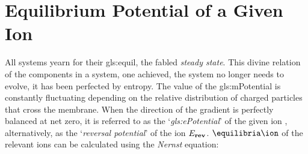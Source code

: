\documentclass[../../Orator]{subfiles}
\begin{document}
\section{Equilibrium Potential of a Given Ion}
\begingroup
\allowdisplaybreaks
All systems yearn for their \gls{gls:equil}, the fabled \textit{steady state}. This divine relation of the components in a system, one achieved, the system no longer needs to evolve, it has been perfected by entropy. 
The value of the \gls{gls:mPotential} is constantly fluctuating depending on the relative distribution of charged particles that cross the membrane. 
When the direction of the gradient is perfectly balanced at net zero, it is referred to as the `\textit{\gls{gls:ePotential}}' of the given ion \br{\unit{\equilibria\ion}}, alternatively, as the `\textit{reversal potential}' of the ion \(E_{\mathbf{rev}}\). 
\(\unit{\equilibria\ion}\) of the relevant ions can be calculated using the \textit{Nernst} equation:
\end{document}
